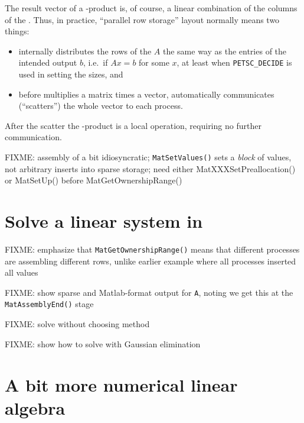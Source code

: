The result vector of a \pMat-\pVec product is, of course, a linear combination of the columns of the \pMat.  Thus, in practice, ``parallel row storage'' layout normally means two things:\begin{itemize}
\item \PETSc internally distributes the rows of the \pMat $A$ the same way as the entries of the intended output \pVec $b$, i.e.~if $Ax=b$ for some $x$, at least when \texttt{PETSC\_DECIDE} is used in setting the \pMat sizes, and
\item before \PETSc multiplies a matrix times a vector, \PETSc automatically communicates (``scatters'') the whole vector to each process.
\end{itemize}
After the scatter the \pMat-\pVec product is a local operation, requiring no further communication.

FIXME: assembly of \pMat a bit idiosyncratic; \texttt{MatSetValues()} sets a \emph{block} of values, not arbitrary inserts into sparse storage; need either MatXXXSetPreallocation() or MatSetUp() before MatGetOwnershipRange()


\section{Solve a linear system in \PETSc}


FIXME: emphasize that \texttt{MatGetOwnershipRange()} means that different processes are assembling different rows, unlike earlier example where all processes inserted all values



FIXME: show sparse and Matlab-format output for \texttt{A}, noting we get this at the \texttt{MatAssemblyEnd()} stage %

FIXME: solve without choosing method

FIXME: show how to solve with Gaussian elimination


\section{A bit more numerical linear algebra}

